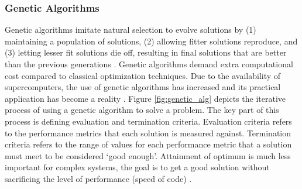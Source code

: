 \subsubsection{Genetic Algorithms}
Genetic algorithms imitate natural selection to evolve solutions 
by (1) maintaining a population of solutions, (2) allowing 
fitter solutions reproduce, and (3) letting lesser fit solutions die off, 
resulting in final solutions that are better than the previous generations 
\cite{renner_genetic_2003}. 
Genetic algorithms demand extra computational cost compared to classical 
optimization techniques. 
Due to the availability of supercomputers, the use of genetic algorithms 
has increased and its practical application has become a reality
\cite{pereira_genetic_2000}. 
Figure \ref{fig:genetic_alg} depicts the iterative process of using a genetic 
algorithm to solve a problem. 
The key part of this process is defining evaluation and termination criteria. 
Evaluation criteria refers to the performance metrics that each solution is 
measured against. 
Termination criteria refers to the range of values for each performance metric
that a solution must meet to be considered `good enough'. 
Attainment of optimum is much less important for complex systems, the goal is 
to get a good solution without sacrificing the level of performance (speed of 
code) \cite{zames_genetic_1981}. 

